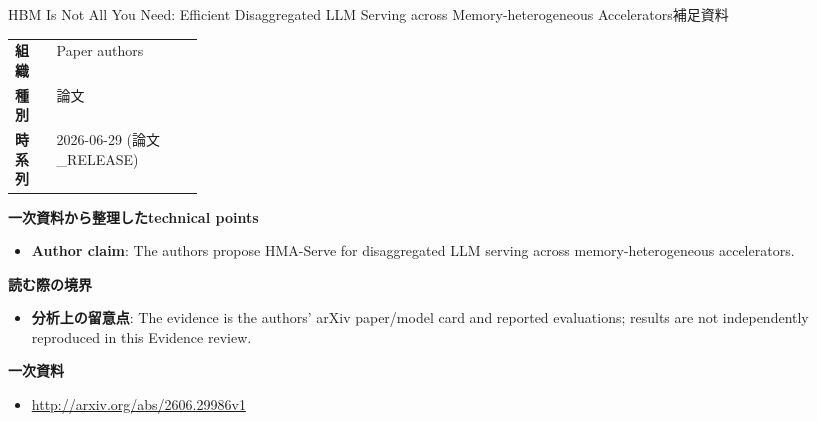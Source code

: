 \begin{technicalnote}{HBM Is Not All You Need: Efficient Disaggregated LLM Serving across Memory-heterogeneous Accelerators}{補足資料}
\begin{tabularx}{\linewidth}{@{}>{\bfseries}p{0.22\linewidth}X@{}}
組織 & Paper authors \\
種別 & 論文 \\
時系列 & 2026-06-29 (論文\_RELEASE) \\
\end{tabularx}
\smallskip
{\bfseries 一次資料から整理したtechnical points}
\begin{itemize}[leftmargin=1.5em,itemsep=0.35em]
\item \textbf{Author claim}: The authors propose HMA-Serve for disaggregated LLM serving across memory-heterogeneous accelerators.
\end{itemize}
{\bfseries 読む際の境界}
\begin{itemize}[leftmargin=1.5em,itemsep=0.35em]
\item \textbf{分析上の留意点}: The evidence is the authors' arXiv paper/model card and reported evaluations; results are not independently reproduced in this Evidence review.
\end{itemize}
{\bfseries 一次資料}
\begingroup\sloppy
\begin{itemize}[leftmargin=1.5em,itemsep=0.25em]
\item {\scriptsize\url{http://arxiv.org/abs/2606.29986v1}}
\end{itemize}
\endgroup
\end{technicalnote}
\medskip

